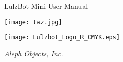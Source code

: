 %
%
%
%
%

\date {}
\thispagestyle{empty}
\begingroup
\centering 

\begin{center}
\fontsize{24pt}{1em}\selectfont LulzBot Mini User Manual
\end{center}

\begin{comment}
\begin{center}
\fontspec{Outage.ttf}\fontsize{24pt}{1em}\selectfont LulzBot TAZ
\texttt{[image: outage-6.png]}
\fontspec{Outage.ttf}\fontsize{24pt}{1em}\selectfont User Manual
\end{center}
\end{comment}

\par




\texttt{[image: taz.jpg]}


\begin{center}
\texttt{[image: Lulzbot\_Logo\_R\_CMYK.eps]}

{\large \itshape Aleph Objects, Inc.}
\end{center}
\endgroup

